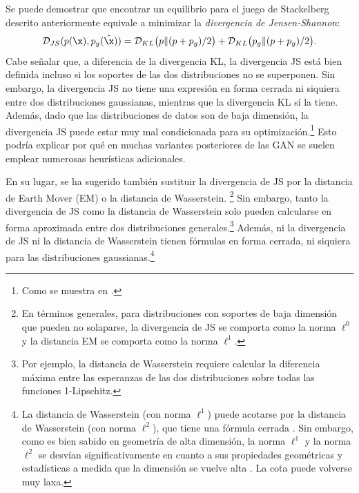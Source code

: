 \documentclass[../../book-main_es.tex]{subfiles}
\begin{document}
Se puede demostrar que encontrar un equilibrio para el juego de Stackelberg descrito anteriormente
equivale a minimizar la {\em divergencia de Jensen-Shannon}:
\begin{equation}
    \mathcal{D}_{JS}(p(\x), p_g(\hat \x)) = \mathcal{D}_{KL}\big(p \|
    (p + p_g)/{2}\big) + \mathcal{D}_{KL}\big(p_g \| (p + p_g)/{2}\big).
\end{equation}
Cabe señalar que, a diferencia de la divergencia KL, la divergencia JS está
bien definida incluso si los soportes de las dos distribuciones
no se superponen. Sin embargo, la divergencia JS no tiene una expresión en forma cerrada
ni siquiera entre dos distribuciones gaussianas, mientras que la divergencia KL sí la tiene. Además,
dado que las distribuciones de datos son de baja dimensión, la
divergencia JS puede estar muy mal condicionada para su optimización.\footnote{Como
se muestra en \cite{arjovsky2017wasserstein}.} Esto podría explicar por qué
en muchas variantes posteriores de las GAN se suelen emplear numerosas heurísticas adicionales.

En su lugar, se ha sugerido también sustituir la divergencia de JS por
la distancia de Earth Mover (EM) o la distancia de Wasserstein.
\footnote{En términos generales, para distribuciones con
    soportes de baja dimensión que pueden no solaparse, la
    divergencia de JS se comporta como la norma $\ell^0$ y la distancia EM
se comporta como la norma $\ell^1$.} Sin embargo, tanto la divergencia de JS como
la distancia de Wasserstein solo pueden calcularse en forma aproximada entre dos
distribuciones generales.\footnote{Por ejemplo, la distancia de Wasserstein
    requiere calcular la diferencia máxima entre
    las esperanzas de las dos distribuciones sobre todas las funciones 
1-Lipschitz.} Además, ni la divergencia de JS ni la
distancia de Wasserstein tienen fórmulas en forma cerrada, ni siquiera para las 
distribuciones gaussianas.\footnote{La distancia de Wasserstein (con norma $\ell^1$) puede
    acotarse por la distancia de Wasserstein (con norma $\ell^2$), que tiene una
    fórmula cerrada \cite{salmona2021gromovwasserstein}. Sin embargo, como es
    bien sabido en geometría de alta dimensión, la norma $\ell^1$ y la norma $\ell^2$
    se desvían significativamente en cuanto a sus propiedades geométricas y
    estadísticas a medida que la dimensión se vuelve alta
\cite{Wright-Ma-2022}. La cota puede volverse muy laxa.}
\end{document}
